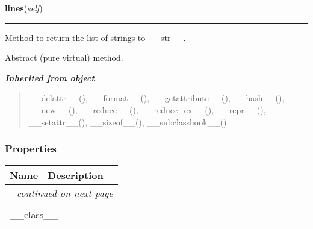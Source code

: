     \label{theia:optics:component:SetupComponent:lines}

    \vspace{0.5ex}

\hspace{.8\funcindent}\begin{boxedminipage}{\funcwidth}

    \raggedright \textbf{lines}(\textit{self})

    \vspace{-1.5ex}

    \rule{\textwidth}{0.5\fboxrule}
\setlength{\parskip}{2ex}
    Method to return the list of strings to \_\_str\_\_.

    Abstract (pure virtual) method.

\setlength{\parskip}{1ex}
    \end{boxedminipage}


\large{\textbf{\textit{Inherited from object}}}

\begin{quote}
\_\_delattr\_\_(), \_\_format\_\_(), \_\_getattribute\_\_(), \_\_hash\_\_(), \_\_new\_\_(), \_\_reduce\_\_(), \_\_reduce\_ex\_\_(), \_\_repr\_\_(), \_\_setattr\_\_(), \_\_sizeof\_\_(), \_\_subclasshook\_\_()
\end{quote}


  \subsubsection{Properties}

    \vspace{-1cm}
\hspace{\varindent}\begin{longtable}{|p{\varnamewidth}|p{\vardescrwidth}|l}
\cline{1-2}
\cline{1-2} \centering \textbf{Name} & \centering \textbf{Description}& \\
\cline{1-2}
\endhead\cline{1-2}\multicolumn{3}{r}{\small\textit{continued on next page}}\\\endfoot\cline{1-2}
\endlastfoot\multicolumn{2}{|l|}{\textit{Inherited from object}}\\
\multicolumn{2}{|p{\varwidth}|}{\raggedright \_\_class\_\_}\\
\cline{1-2}
\end{longtable}


